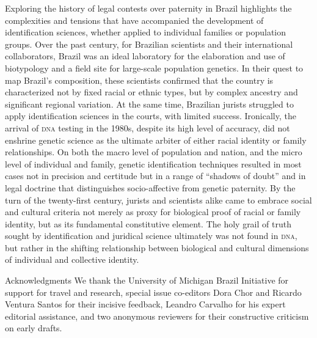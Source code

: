 \documentclass{article}
\begin{document}
Exploring the history of legal contests over paternity in Brazil highlights the
complexities and tensions that have accompanied the development of
identification sciences, whether applied to individual families or population
groups. Over the past century, for Brazilian scientists and their international
collaborators, Brazil was an ideal laboratory for the elaboration and use of
biotypology and a field site for large-scale population genetics. In their quest
to map Brazil’s composition, these scientists confirmed that the country is
characterized not by fixed racial or ethnic types, but by complex ancestry and
significant regional variation. At the same time, Brazilian jurists struggled to
apply identification sciences in the courts, with limited success. Ironically,
the arrival of \textsc{dna} testing in the 1980s, despite its high level of accuracy, did
not enshrine genetic science as the ultimate arbiter of either racial identity
or family relationships. On both the macro level of population and nation, and
the micro level of individual and family, genetic identification techniques
resulted in most cases not in precision and certitude but in a range of “shadows
of doubt” and in legal doctrine that distinguishes socio-affective from genetic
paternity. By the turn of the twenty-first century, jurists and scientists alike
came to embrace social and cultural criteria not merely as proxy for biological
proof of racial or family identity, but as its fundamental constitutive element.
The holy grail of truth sought by identification and juridical science
ultimately was not found in \textsc{dna}, but rather in the shifting relationship between
biological and cultural dimensions of individual and collective identity.

Acknowledgments
We thank the University of Michigan Brazil Initiative for support for travel and
research, special issue co-editors Dora Chor and Ricardo Ventura Santos for
their incisive feedback, Leandro Carvalho for his expert editorial assistance,
and two anonymous reviewers for their constructive criticism on early drafts.
\end{document}
